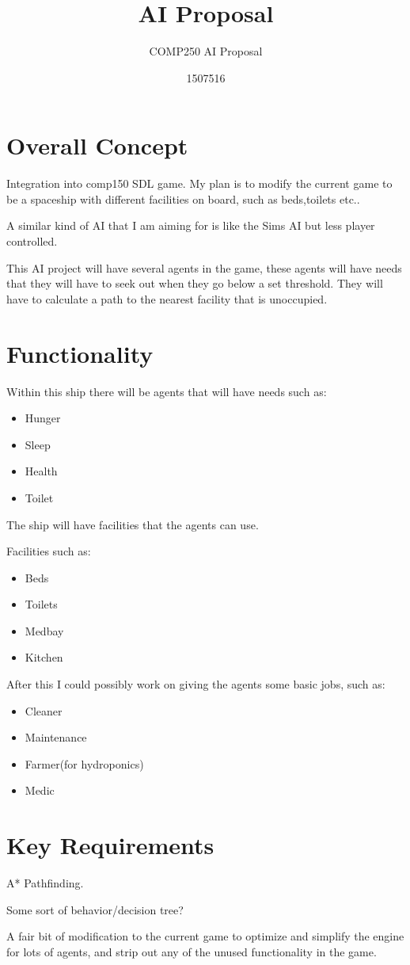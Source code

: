 \documentclass{scrartcl}
\title{AI Proposal}
\subtitle{COMP250 AI Proposal}
\author{1507516}
\begin{document}
\maketitle

\section{Overall Concept}
Integration into comp150 SDL game.
My plan is to modify the current game to be a spaceship with different facilities on board, such as beds,toilets etc..

A similar kind of AI that I am aiming for is like the Sims AI but less player controlled.

This AI project will have several agents in the game, these agents will have needs that they will have to seek out when they go below a set threshold. 
They will have to calculate a path to the nearest facility that is unoccupied.


\section{Functionality}
Within this ship there will be agents that will have needs such as:

\begin{itemize}
  \item Hunger
  \item Sleep
  \item Health
  \item Toilet
\end{itemize}

The ship will have facilities that the agents can use.

Facilities such as:

\begin{itemize}
  \item Beds
  \item Toilets
  \item Medbay
  \item Kitchen
\end{itemize}

After this I could possibly work on giving the agents some basic jobs, such as:

\begin{itemize}
	\item Cleaner
	\item Maintenance
	\item Farmer(for hydroponics)
	\item Medic
\end{itemize}

\section{Key Requirements}

A* Pathfinding.

Some sort of behavior/decision tree?

A fair bit of modification to the current game to optimize and simplify the engine for lots of agents, and strip out any of the unused functionality in the game.
\end{document}
